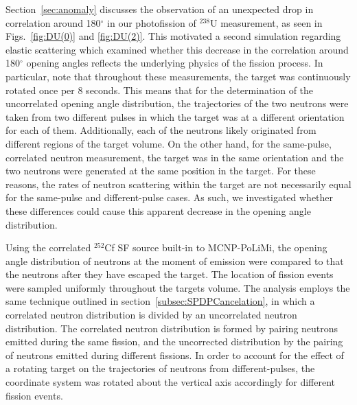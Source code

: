 \documentclass[%
 reprint,
 amsmath,amssymb,
 aps,
 nofootinbib
]{revtex4-1}
\begin{document}
Section~\ref{sec:anomaly} discusses the observation of an unexpected drop in correlation around 180$^{\circ}$ in our photofission of $^{238}$U measurement, as seen in Figs.~\ref{fig:DU(0)} and \ref{fig:DU(2)}.
This motivated a second simulation regarding elastic scattering which examined whether this decrease in the correlation around 180$^{\circ}$ opening angles reflects the underlying physics of the fission process.
In particular, note that throughout these measurements, the target was continuously rotated once per 8 seconds.
This means that for the determination of the uncorrelated opening angle distribution, the trajectories of the two neutrons were taken from two different pulses in which the target was at a different orientation for each of them.
Additionally, each of the neutrons likely originated from different regions of the target volume.
On the other hand, for the same-pulse, correlated neutron measurement, the target was in the same orientation and the two neutrons were generated at the same position in the target.
For these reasons, the rates of neutron scattering within the target are not necessarily equal for the same-pulse and different-pulse cases.
As such, we investigated whether these differences could cause this apparent decrease in the opening angle distribution.

Using the correlated $^{252}$Cf SF source built-in to MCNP-PoLiMi, the opening angle distribution of neutrons at the moment of emission were compared to that the neutrons after they have escaped the target.
The location of fission events were sampled uniformly throughout the targets volume.
The analysis employs the same technique outlined in section~\ref{subsec:SPDPCancelation}, in which a correlated neutron distribution is divided by an uncorrelated neutron distribution.
The correlated neutron distribution is formed by pairing neutrons emitted during the same fission, and the uncorrected distribution by the pairing of neutrons emitted during different fissions.
In order to account for the effect of a rotating target on the trajectories of neutrons from different-pulses, the coordinate system was rotated about the vertical axis accordingly for different fission events.
\end{document}

